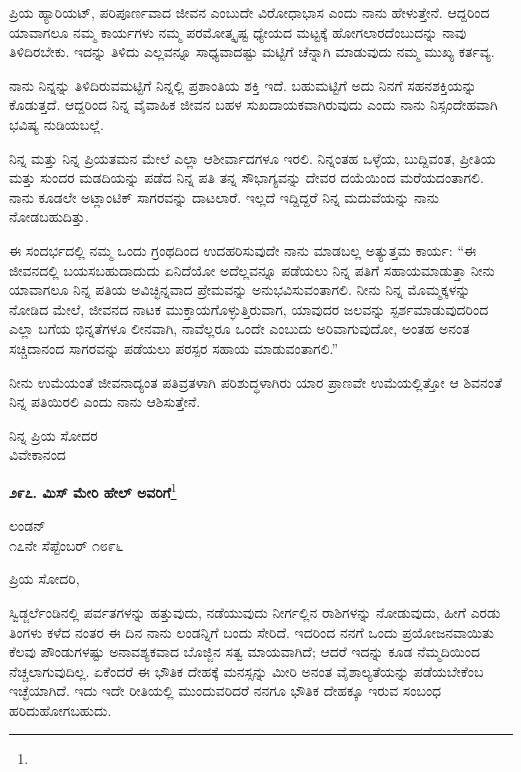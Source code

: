 ಪ್ರಿಯ ಹ್ಯಾರಿಯಟ್, ಪರಿಪೂರ್ಣವಾದ ಜೀವನ ಎಂಬುದೇ ವಿರೋಧಾಭಾಸ ಎಂದು ನಾನು ಹೇಳುತ್ತೇನೆ. ಆದ್ದರಿಂದ ಯಾವಾಗಲೂ ನಮ್ಮ ಕಾರ್ಯಗಳು ನಮ್ಮ ಪರಮೋತ್ಕೃಷ್ಟ ಧ್ಯೇಯದ ಮಟ್ಟಕ್ಕೆ ಹೋಗಲಾರದೆಂಬುದನ್ನು ನಾವು ತಿಳಿದಿರಬೇಕು. ಇದನ್ನು ತಿಳಿದು ಎಲ್ಲವನ್ನೂ ಸಾಧ್ಯವಾದಷ್ಟು ಮಟ್ಟಿಗೆ ಚೆನ್ನಾಗಿ ಮಾಡುವುದು ನಮ್ಮ ಮುಖ್ಯ ಕರ್ತವ್ಯ.

ನಾನು ನಿನ್ನನ್ನು ತಿಳಿದಿರುವಮಟ್ಟಿಗೆ ನಿನ್ನಲ್ಲಿ ಪ್ರಶಾಂತಿಯ ಶಕ್ತಿ ಇದೆ. ಬಹುಮಟ್ಟಿಗೆ ಅದು ನಿನಗೆ ಸಹನಶಕ್ತಿಯನ್ನು ಕೊಡುತ್ತದೆ. ಆದ್ದರಿಂದ ನಿನ್ನ ವೈವಾಹಿಕ ಜೀವನ ಬಹಳ ಸುಖದಾಯಕವಾಗಿರುವುದು ಎಂದು ನಾನು ನಿಸ್ಸಂದೇಹವಾಗಿ ಭವಿಷ್ಯ ನುಡಿಯಬಲ್ಲೆ.

ನಿನ್ನ ಮತ್ತು ನಿನ್ನ ಪ್ರಿಯತಮನ ಮೇಲೆ ಎಲ್ಲಾ ಆಶೀರ್ವಾದಗಳೂ ಇರಲಿ. ನಿನ್ನಂತಹ ಒಳ್ಳೆಯ, ಬುದ್ದಿವಂತ, ಪ್ರೀತಿಯ ಮತ್ತು ಸುಂದರ ಮಡದಿಯನ್ನು ಪಡೆದ ನಿನ್ನ ಪತಿ ತನ್ನ ಸೌಭಾಗ್ಯವನ್ನು ದೇವರ ದಯೆಯಿಂದ ಮರೆಯದಂತಾಗಲಿ. ನಾನು ಕೂಡಲೇ ಅಟ್ಲಾಂಟಿಕ್ ಸಾಗರವನ್ನು ದಾಟಲಾರೆ. ಇಲ್ಲದೆ ಇದ್ದಿದ್ದರೆ ನಿನ್ನ ಮದುವೆಯನ್ನು ನಾನು ನೋಡಬಹುದಿತ್ತು.

ಈ ಸಂದರ್ಭದಲ್ಲಿ ನಮ್ಮ ಒಂದು ಗ್ರಂಥದಿಂದ ಉದಹರಿಸುವುದೇ ನಾನು ಮಾಡಬಲ್ಲ ಅತ್ಯುತ್ತಮ ಕಾರ್ಯ: “ಈ ಜೀವನದಲ್ಲಿ ಬಯಸಬಹುದಾದುದು ಏನಿದೆಯೋ ಅದೆಲ್ಲವನ್ನೂ ಪಡೆಯಲು ನಿನ್ನ ಪತಿಗೆ ಸಹಾಯಮಾಡುತ್ತಾ ನೀನು ಯಾವಾಗಲೂ ನಿನ್ನ ಪತಿಯ ಅವಿಚ್ಛಿನ್ನವಾದ ಪ್ರೇಮವನ್ನು ಅನುಭವಿಸುವಂತಾಗಲಿ. ನೀನು ನಿನ್ನ ಮೊಮ್ಮಕ್ಕಳನ್ನು ನೋಡಿದ ಮೇಲೆ, ಜೀವನದ ನಾಟಕ ಮುಕ್ತಾಯಗೊಳ್ಳುತ್ತಿರುವಾಗ, ಯಾವುದರ ಜಲವನ್ನು ಸ್ಪರ್ಶಮಾಡುವುದರಿಂದ ಎಲ್ಲಾ ಬಗೆಯ ಭಿನ್ನತೆಗಳೂ ಲೀನವಾಗಿ, ನಾವೆಲ್ಲರೂ ಒಂದೇ ಎಂಬುದು ಅರಿವಾಗುವುದೋ, ಅಂತಹ ಅನಂತ ಸಚ್ಚಿದಾನಂದ ಸಾಗರವನ್ನು ಪಡೆಯಲು ಪರಸ್ಪರ ಸಹಾಯ ಮಾಡುವಂತಾಗಲಿ.”

ನೀನು ಉಮೆಯಂತೆ ಜೀವನಾದ್ಯಂತ ಪತಿವ್ರತಳಾಗಿ ಪರಿಶುದ್ಧಳಾಗಿರು\enginline{-} ಯಾರ ಪ್ರಾಣವೇ ಉಮೆಯಲ್ಲಿತ್ತೋ ಆ ಶಿವನಂತೆ ನಿನ್ನ ಪತಿಯಿರಲಿ ಎಂದು ನಾನು ಆಶಿಸುತ್ತೇನೆ.

{\flushright
ನಿನ್ನ ಪ್ರಿಯ ಸೋದರ\\ವಿವೇಕಾನಂದ\par}

\begin{center}
\textbf{೨೯೭. ಮಿಸ್ ಮೇರಿ ಹೇಲ್‌ ಅವರಿಗೆ}\footnote{}
\end{center}

\begin{flushright}
ಲಂಡನ್\\೧೭ನೇ ಸೆಪ್ಟೆಂಬರ್ ೧೮೯೬
\end{flushright}

\noindent
ಪ್ರಿಯ ಸೋದರಿ,

ಸ್ವಿಡ್ಜರ್ಲೆಂಡಿನಲ್ಲಿ ಪರ್ವತಗಳನ್ನು ಹತ್ತುವುದು, ನಡೆಯುವುದು ನೀರ್ಗಲ್ಲಿನ ರಾಶಿಗಳನ್ನು ನೋಡುವುದು, ಹೀಗೆ ಎರಡು ತಿಂಗಳು ಕಳೆದ ನಂತರ ಈ ದಿನ ನಾನು ಲಂಡನ್ನಿಗೆ ಬಂದು ಸೇರಿದೆ. ಇದರಿಂದ ನನಗೆ ಒಂದು ಪ್ರಯೋಜನವಾಯಿತು\enginline{-} ಕೆಲವು ಪೌಂಡುಗಳಷ್ಟು ಅನಾವಶ್ಯಕವಾದ ಬೊಜ್ಜಿನ ಸತ್ವ ಮಾಯವಾಗಿದೆ; ಆದರೆ ಇದನ್ನು ಕೂಡ ನೆಮ್ಮದಿಯಿಂದ ನೆಚ್ಚಲಾಗುವುದಿಲ್ಲ. ಏಕೆಂದರೆ ಈ ಭೌತಿಕ ದೇಹಕ್ಕೆ ಮನಸ್ಸನ್ನು ಮೀರಿ ಅನಂತ ವೈಶಾಲ್ಯತೆಯನ್ನು ಪಡೆಯಬೇಕೆಂಬ ಇಚ್ಛೆಯಾಗಿದೆ. ಇದು ಇದೇ ರೀತಿಯಲ್ಲಿ ಮುಂದುವರಿದರೆ ನನಗೂ ಭೌತಿಕ ದೇಹಕ್ಕೂ ಇರುವ ಸಂಬಂಧ ಹರಿದುಹೋಗಬಹುದು.

